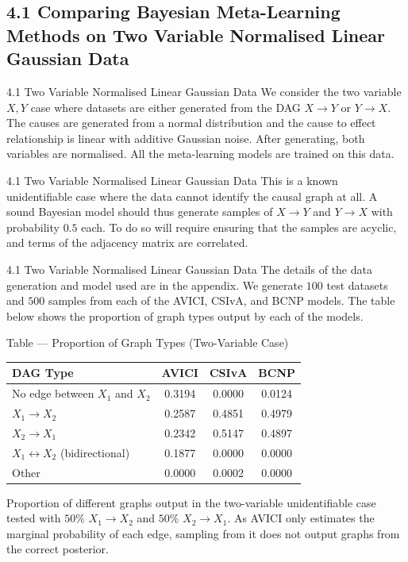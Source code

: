\documentclass[aspectratio=169,10pt]{beamer}
\begin{document}
\subsection{4.1 Comparing Bayesian Meta-Learning Methods on Two Variable Normalised Linear Gaussian Data}

\begin{frame}{4.1 Two Variable Normalised Linear Gaussian Data}
\small
We consider the two variable $X, Y$ case where datasets are either generated from the DAG $X \to Y$ or $Y \to X$. The causes are generated from a normal distribution and the cause to effect relationship is linear with additive Gaussian noise. After generating, both variables are normalised. All the meta-learning models are trained on this data.
\end{frame}

\begin{frame}{4.1 Two Variable Normalised Linear Gaussian Data}
This is a known unidentifiable case where the data cannot identify the causal graph at all. A sound Bayesian model should thus generate samples of $X \to Y$ and $Y \to X$ with probability $0.5$ each. To do so will require ensuring that the samples are acyclic, and terms of the adjacency matrix are correlated.
\end{frame}

\begin{frame}{4.1 Two Variable Normalised Linear Gaussian Data}
The details of the data generation and model used are in the appendix. We generate $100$ test datasets and $500$ samples from each of the AVICI, CSIvA, and BCNP models. The table below shows the proportion of graph types output by each of the models.
\end{frame}

\begin{frame}{Table --- Proportion of Graph Types (Two-Variable Case)}
\centering
\begin{tabular}{lccc}
\toprule
\textbf{DAG Type}     & \textbf{AVICI} & \textbf{CSIvA} & \textbf{BCNP} \\
\midrule
No edge between $X_1$ and $X_2$  & 0.3194 & 0.0000 & 0.0124 \\
$X_1 \rightarrow X_2$            & 0.2587 & 0.4851 & 0.4979 \\
$X_2 \rightarrow X_1$            & 0.2342 & 0.5147 & 0.4897 \\
$X_1 \leftrightarrow X_2$ (bidirectional) & 0.1877 & 0.0000 & 0.0000 \\
Other                            & 0.0000 & 0.0002 & 0.0000 \\
\bottomrule
\end{tabular}

\vspace{0.3cm}
{\footnotesize Proportion of different graphs output in the two-variable unidentifiable case tested with $50\%$ $X_1 \to X_2$ and $50\%$ $X_2 \to X_1$. As AVICI only estimates the marginal probability of each edge, sampling from it does not output graphs from the correct posterior.}
\end{frame}
\end{document}
